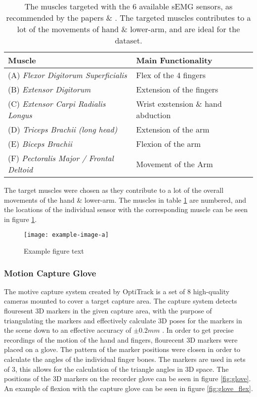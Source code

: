 \documentclass[../main.tex]{subfiles}
\begin{document}
\begin{table}[h]
\begin{center}
\begin{tabular}{ |l|l| } 
\hline
Muscle & Main Functionality \\ 
\hline
(A)  \textit{Flexor Digitorum Superficialis} & Flex of the 4 fingers \\
(B)  \textit{Extensor Digitorum} & Extension of the fingers \\
(C)  \textit{Extensor Carpi Radialis Longus} & Wrist exstension \& hand abduction \\
(D)  \textit{Triceps Brachii (long head)} & Extension of the arm \\
(E)  \textit{Biceps Brachii} & Flexion of the arm \\
(F)  \textit{Pectoralis Major / Frontal Deltoid} & Movement of the Arm \\
\hline
\end{tabular}
\caption{The muscles targeted with the 6 available sEMG sensors, as recommended by the papers  \cite{jarque2019} \& \cite{Batzianoulis2018}.
 The targeted muscles contributes to a lot of the movements of hand \& lower-arm, and are ideal for the dataset.
}
\label{tab:muscletargets}
\end{center}
\end{table}

The target muscles were chosen as they contribute to a lot of the overall movements of the hand \& lower-arm.
The muscles in table \ref{tab:muscletargets} are numbered, and the locations of the individual sensor with the corresponding muscle can be seen in figure \ref{fig:musclesensors}.

\begin{figure}[h]
\begin{center}
\texttt{[image: example-image-a]}
\caption{Example figure text}
\label{fig:musclesensors}
\end{center}
\end{figure}

\subsubsection{Motion Capture Glove}

The motive capture system created by OptiTrack is a set of 8 high-quality cameras mounted to cover a target capture area.
The capture system detects flouresent 3D markers in the given capture area, with the purpose of triangulating the markers and effectively calculate 3D poses for the markers in the scene down to an effective accuracy of $\pm 0.2mm$ \cite{motive}.
In order to get precise recordings of the motion of the hand and fingers, flourecent 3D markers were placed on a glove.
The pattern of the marker positions were closen in order to calculate the angles of the individual finger bones.
The markers are used in sets of 3, this allows for the calculation of the triangle angles in 3D space.
The positions of the 3D markers on the recorder glove can be seen in figure \ref{fig:glove}.
An example of flexion with the capture glove can be seen in figure \ref{fig:glove_flex}.
\end{document}
